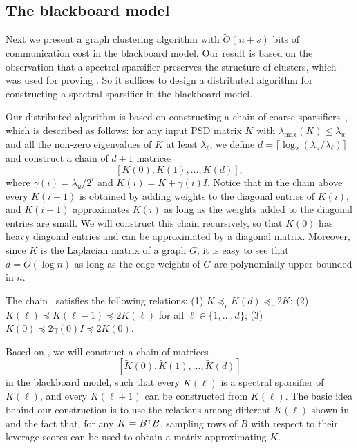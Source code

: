 
\subsection{The blackboard model\label{sec:bb}}
Next we present a graph clustering algorithm with $\tilde{O}(n+s)$ bits of communication cost in the blackboard model. 
Our result is based on the observation that a spectral sparsifier preserves the structure of clusters, which was used for proving . So it suffices to design a  distributed algorithm for constructing a spectral sparsifier in the blackboard model. 


Our distributed algorithm  is based on constructing a chain of coarse sparsifiers~\cite{MP12}, which is described as follows: for any input \textsf{PSD} matrix $K$ with $\lambda_{\max}(K)\leq \lambda_u$ and all the non-zero eigenvalues of $K$  at least $\lambda_{\ell}$,   we define $d=\lceil \log_2(\lambda_u/\lambda_{\ell})\rceil$ and construct a chain of $d+1$ matrices
\begin{equation}\label{eq:chain}
[K(0),K(1),\ldots, K(d)],
\end{equation}
where $ 
\gamma(i)=\lambda_u/2^i$ and $K(i)= K+\gamma(i)I$.
Notice that in the chain above every $K(i-1)$
 is obtained by adding weights to the diagonal entries of $K(i)$, and 
 $K(i-1)$ approximates $K(i)$ as long as the weights added to the diagonal entries are  small.  
We will construct this chain recursively, so that $K(0)$ has heavy diagonal entries and can be approximated by a diagonal matrix. Moreover, since $K$ is the Laplacian matrix of a graph $G$, it is easy to see that $d=O(\log n)$ as long as the edge weights of $G$  are polynomially upper-bounded in $n$.


\begin{lem}[\cite{MP12}] \label{lem:MP12}
The chain~ satisfies the following relations: (1) 
 $K\preceq_r K(d)\preceq_r 2K$;
(2)  $K(\ell) \preceq K(\ell-1) \preceq 2K(\ell)$ for all $\ell\in\{1,\ldots, d\}$;
(3)  $K(0)\preceq 2\gamma(0)I\preceq 2K(0)$.
\end{lem}






Based on , we will construct a chain of matrices  
\begin{equation}\label{eq:aptchain}
\left[ \tilde{K}(0), \tilde{K}(1),\ldots, \tilde{K}(d) \right]
\end{equation}
in the blackboard model, 
such that every $\tilde{K}(\ell)$ is a spectral sparsifier of $K(\ell)$, and 
every $\tilde{K}(\ell+1)$ can be constructed from $\tilde{K}(\ell)$.  The basic idea behind our construction is to use the relations among different $K(\ell)$ shown in  and the fact that, for any $K=B^{\intercal}B$, sampling rows of $B$ with respect to their leverage scores can be used to obtain a matrix approximating $K$.


